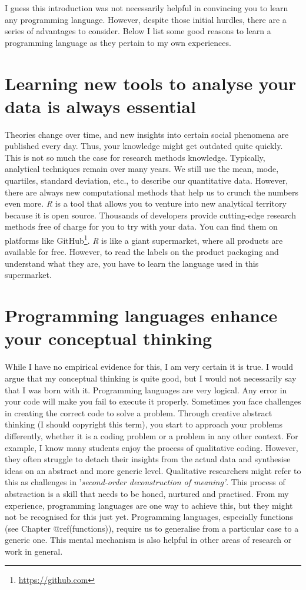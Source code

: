 \documentclass[
  letterpaper,
]{krantz}
\renewcommand{\href}[2]{#2\footnote{\url{#1}}}
\begin{document}
I guess this introduction was not necessarily helpful in convincing you
to learn any programming language. However, despite those initial
hurdles, there are a series of advantages to consider. Below I list some
good reasons to learn a programming language as they pertain to my own
experiences.

\section{Learning new tools to analyse your data is always
essential}\label{learning-new-tools-to-analyse-your-data-is-always-essential}

Theories change over time, and new insights into certain social
phenomena are published every day. Thus, your knowledge might get
outdated quite quickly. This is not so much the case for research
methods knowledge. Typically, analytical techniques remain over many
years. We still use the mean, mode, quartiles, standard deviation, etc.,
to describe our quantitative data. However, there are always new
computational methods that help us to crunch the numbers even more.
\emph{R} is a tool that allows you to venture into new analytical
territory because it is open source. Thousands of developers provide
cutting-edge research methods free of charge for you to try with your
data. You can find them on platforms like
\href{https://github.com}{GitHub}. \emph{R} is like a giant supermarket,
where all products are available for free. However, to read the labels
on the product packaging and understand what they are, you have to learn
the language used in this supermarket.

\section{Programming languages enhance your conceptual
thinking}\label{programming-languages-enhance-your-conceptual-thinking}

While I have no empirical evidence for this, I am very certain it is
true. I would argue that my conceptual thinking is quite good, but I
would not necessarily say that I was born with it. Programming languages
are very logical. Any error in your code will make you fail to execute
it properly. Sometimes you face challenges in creating the correct code
to solve a problem. Through creative abstract thinking (I should
copyright this term), you start to approach your problems differently,
whether it is a coding problem or a problem in any other context. For
example, I know many students enjoy the process of qualitative coding.
However, they often struggle to detach their insights from the actual
data and synthesise ideas on an abstract and more generic level.
Qualitative researchers might refer to this as challenges in
'\emph{second-order deconstruction of meaning'}. This process of
abstraction is a skill that needs to be honed, nurtured and practised.
From my experience, programming languages are one way to achieve this,
but they might not be recognised for this just yet. Programming
languages, especially functions (see Chapter @ref(functions)), require
us to generalise from a particular case to a generic one. This mental
mechanism is also helpful in other areas of research or work in general.
\end{document}
